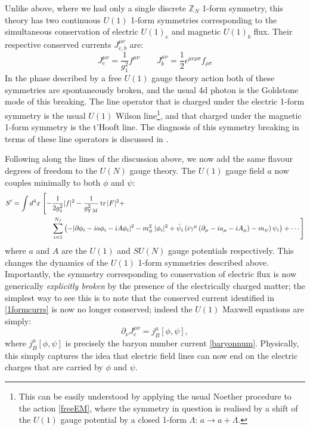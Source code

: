 \documentclass[aps,preprint,nofootinbib,preprintnumbers,eqsecnum,superscriptaddress]{revtex4}
\newcommand \tr {\mbox{{\bf Tr}}}
\def\tr{\mathop{\rm tr}}
\newcommand\half{{\ensuremath{\frac{1}{2}}}}
\newcommand\p{\ensuremath{\partial}}
\newcommand\ep{\epsilon}
\newcommand\sig{\sigma}
\newcommand\Lam{\Lambda}
\newcommand\ga{{\ensuremath{{\gamma}}}}
\newcommand\ha{{\half}}
\def\le{\left}
\def\ri{\right}
\begin{document}
Unlike above, where we had only a single discrete $\mathbb{Z}_N$ 1-form symmetry, this theory has two continuous $U(1)$ 1-form symmetries corresponding to the simultaneous conservation of electric $U(1)_e$ and magnetic $U(1)_b$ flux. Their respective conserved currents $J^{\mu\nu}_{e,b}$ are:
\begin{equation}
J^{\mu\nu}_e = \frac{1}{g_1^2} f^{\mu\nu} \qquad J^{\mu\nu}_b = \ha \ep^{\mu\nu\rho\sig} f_{\rho\sig} \label{1formcurrs} 
\end{equation}
In the phase described by a free $U(1)$ gauge theory action both of these symmetries are spontaneously broken, and the usual 4d photon is the Goldstone mode of this breaking. The line operator that is charged under the electric 1-form symmetry is the usual $U(1)$ Wilson line\footnote{This can be easily understood by applying the usual Noether procedure to the action \eqref{freeEM}, where the symmetry in question is realised by a shift of the $U(1)$ gauge potential by a closed 1-form $\Lam$: $a \to a + \Lam$.}, and that charged under the magnetic 1-form symmetry is the t'Hooft line. The diagnosis of this symmetry breaking in terms of these line operators is discussed in \cite{Hofman:2018lfz,Lake:2018dqm}. 

Following along the lines of the discussion above, we now add the same flavour degrees of freedom to the $U(N)$ gauge theory. The $U(1)$ gauge field $a$ now couples minimally to both $\phi$ and $\psi$:
\begin{align}
S' = \int d^4x \; \Bigg[-& \frac{1}{2 g_1^2} |f|^2 - \frac{1}{ g_{YM}^2} \tr |F|^2 + \nonumber \\
& \sum_{i = 1}^{N_f} \le(-|\p \phi_i - i a \phi_i - i A \phi_i|^2 - m_{\phi}^2 \; |\phi_i|^2 + \bar\psi_i \le(i \ga^{\mu} \le(\p_{\mu} - i a_{\mu} - i A_{\mu} \ri) - m_{\psi}\ri)\psi_i\ri) + \cdots\Bigg] \label{deformLag2} 
\end{align} 
where $a$ and $A$ are the $U(1)$ and $SU(N)$ gauge potentials respectively. This changes the dynamics of the $U(1)$ 1-form symmetries described above. Importantly, the symmetry corresponding to conservation of electric flux is now generically {\it explicitly broken} by the presence of the electrically charged matter; the simplest way to see this is to note that the conserved current identified in \eqref{1formcurrs} is now no longer conserved; indeed the $U(1)$ Maxwell equations are simply:
\begin{equation}
\p_{\nu} J^{\mu\nu}_e = j_B^{\mu}[\phi, \psi], \label{efluxnoncons} 
\end{equation}
where $j_B^{\mu}[\phi, \psi]$ is precisely the baryon number current \eqref{baryonnum}. Physically, this simply captures the idea that electric field lines can now end on the electric charges that are carried by $\phi$ and $\psi$. 
\end{document}
